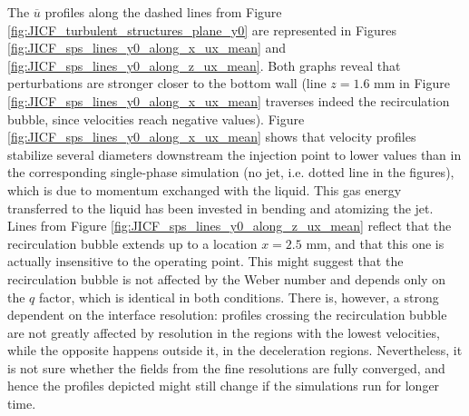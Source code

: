 The $\overline{u}$ profiles along the dashed lines from Figure \ref{fig:JICF_turbulent_structures_plane_y0} are represented in Figures \ref{fig:JICF_sps_lines_y0_along_x_ux_mean} and  \ref{fig:JICF_sps_lines_y0_along_z_ux_mean}. Both graphs reveal that perturbations are stronger closer to the bottom wall (line $z = 1.6$ mm in Figure \ref{fig:JICF_sps_lines_y0_along_x_ux_mean}  traverses indeed the recirculation bubble, since velocities reach negative values). Figure \ref{fig:JICF_sps_lines_y0_along_x_ux_mean} shows that velocity profiles stabilize several diameters downstream the injection point to lower values than in the corresponding single-phase simulation (no jet, i.e. dotted line in the figures), which is due to momentum exchanged with the liquid. This gas energy transferred to the liquid has been invested in bending and atomizing the jet. Lines from Figure \ref{fig:JICF_sps_lines_y0_along_z_ux_mean} reflect that the recirculation bubble extends up to a location $x = 2.5$ mm, and that this one is actually insensitive to the operating point. This might suggest that the recirculation bubble is not affected by the Weber number and depends only on the $q$ factor, which is identical in both conditions. There is, however, a strong dependent on the interface resolution: profiles crossing the recirculation bubble are not greatly affected by resolution in the regions with the lowest velocities, while the opposite happens outside it, in the deceleration regions. Nevertheless, it is not sure whether the fields from the fine resolutions are fully converged, and hence the profiles depicted might still change if the simulations run for longer time.



